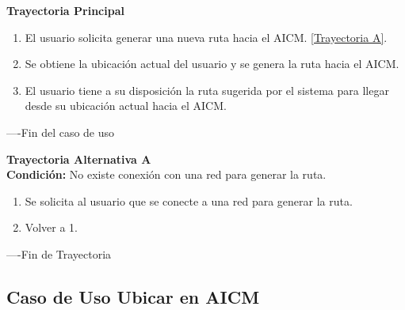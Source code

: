 \begin{flushleft}
	\textbf{Trayectoria Principal}\\
	\begin{enumerate}
		\item El usuario solicita generar una nueva ruta hacia el AICM. \hyperlink{TrayectoriaA_CU-U-07}{[Trayectoria A]}.
		\item Se obtiene la ubicación actual del usuario y se genera la ruta hacia el AICM.
		\item El usuario tiene a su disposición la ruta sugerida por el sistema para llegar desde su ubicación actual hacia el AICM.
	\end{enumerate}
\end{flushleft}
----Fin del caso de uso

\begin{flushleft}
	\hypertarget{TrayectoriaA_CU-U-07}{}
	\textbf{Trayectoria Alternativa A}\\
	\textbf{Condición:} No existe conexión con una red para generar la ruta. \\
	\begin{enumerate}
		\item Se solicita al usuario que se conecte a una red para generar la ruta. 
		\item Volver a 1.
	\end{enumerate}
\end{flushleft}
----Fin de Trayectoria

\subsection{Caso de Uso Ubicar en AICM}

